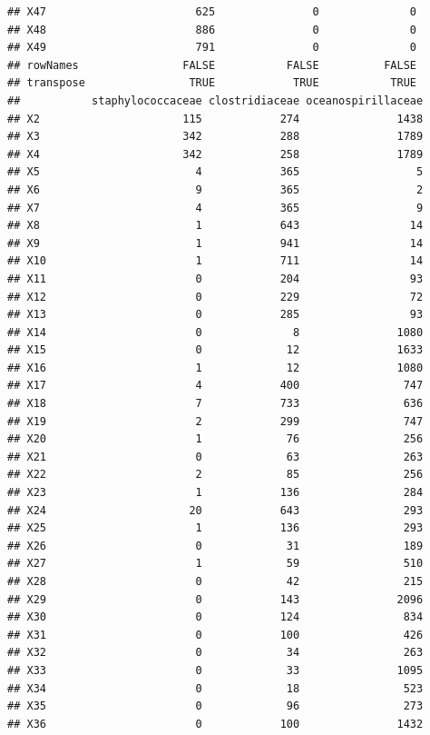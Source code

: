 \documentclass[10pt,handout,english]{beamer}\usepackage[]{graphicx}\usepackage[]{color}
\makeatletter
\newenvironment{kframe}{%
 \def\at@end@of@kframe{}%
 \ifinner\ifhmode%
  \def\at@end@of@kframe{\end{minipage}}%
  \begin{minipage}{\columnwidth}%
 \fi\fi%
 \def\FrameCommand##1{\hskip\@totalleftmargin \hskip-\fboxsep
 \colorbox{shadecolor}{##1}\hskip-\fboxsep
     \hskip-\linewidth \hskip-\@totalleftmargin \hskip\columnwidth}%
 \MakeFramed {\advance\hsize-\width
   \@totalleftmargin\z@ \linewidth\hsize
   \@setminipage}}%
 {\par\unskip\endMakeFramed%
 \at@end@of@kframe}
\newenvironment{knitrout}{}{} %
\makeatother
\begin{document}
\begin{frame}[fragile]
\begin{knitrout}
\begin{kframe}
\begin{verbatim}
## X47                       625               0              0
## X48                       886               0              0
## X49                       791               0              0
## rowNames                FALSE           FALSE          FALSE
## transpose                TRUE            TRUE           TRUE
##           staphylococcaceae clostridiaceae oceanospirillaceae
## X2                      115            274               1438
## X3                      342            288               1789
## X4                      342            258               1789
## X5                        4            365                  5
## X6                        9            365                  2
## X7                        4            365                  9
## X8                        1            643                 14
## X9                        1            941                 14
## X10                       1            711                 14
## X11                       0            204                 93
## X12                       0            229                 72
## X13                       0            285                 93
## X14                       0              8               1080
## X15                       0             12               1633
## X16                       1             12               1080
## X17                       4            400                747
## X18                       7            733                636
## X19                       2            299                747
## X20                       1             76                256
## X21                       0             63                263
## X22                       2             85                256
## X23                       1            136                284
## X24                      20            643                293
## X25                       1            136                293
## X26                       0             31                189
## X27                       1             59                510
## X28                       0             42                215
## X29                       0            143               2096
## X30                       0            124                834
## X31                       0            100                426
## X32                       0             34                263
## X33                       0             33               1095
## X34                       0             18                523
## X35                       0             96                273
## X36                       0            100               1432

\end{verbatim}
\end{kframe}
\end{knitrout}
\end{frame}
\end{document}
